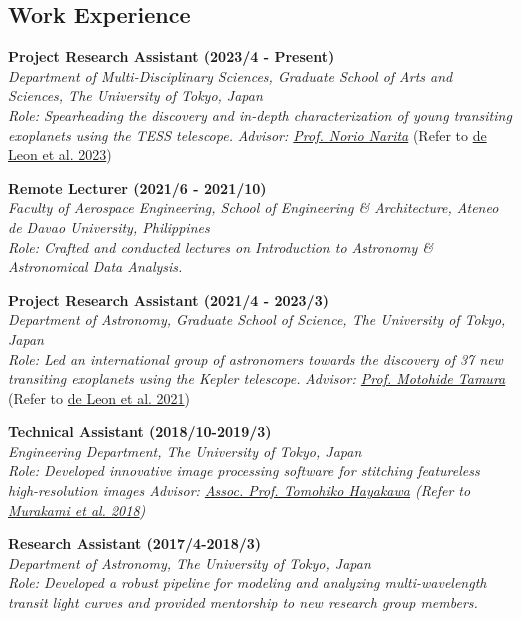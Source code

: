 \documentclass[11pt,letterpaper]{article}
\begin{document}
\subsection{Work Experience}
\begin{list}{}{\cvlist}
    \item
        \textbf{Project Research Assistant (2023/4 - Present)} \\
        \textit{Department of Multi-Disciplinary Sciences, Graduate School of Arts and Sciences, The University of Tokyo, Japan} \\
        \textit{Role: Spearheading the discovery and in-depth characterization of young transiting exoplanets using the TESS telescope.}
        \textit{Advisor: \href{\naritaurl}{Prof. Norio Narita}} (Refer to \href{\paperthree}{de Leon et al. 2023})\\

    \item
        \textbf{Remote Lecturer (2021/6 - 2021/10)} \\
        \textit{Faculty of Aerospace Engineering, School of Engineering \& Architecture, Ateneo de Davao University, Philippines} \\
        \textit{Role: Crafted and conducted lectures on Introduction to Astronomy \& Astronomical Data Analysis.}

    \item
        \textbf{Project Research Assistant (2021/4 - 2023/3)} \\
        \textit{Department of Astronomy, Graduate School of Science, The University of Tokyo, Japan} \\
        \textit{Role: Led an international group of astronomers towards the discovery of 37 new transiting exoplanets using the Kepler telescope.}
        \textit{Advisor: \href{tamuraurl}{Prof. Motohide Tamura}} (Refer to \href{\papertwo}{de Leon et al. 2021})\\
        
    \item 
        \textbf{Technical Assistant (2018/10-2019/3)}\\
        \textit{Engineering Department, The University of Tokyo, Japan}\\
        \textit{Role: Developed innovative image processing software for stitching featureless high-resolution images 
        \textit{Advisor: \href{hayakawaurl}{Assoc. Prof. Tomohiko Hayakawa}} (Refer to \href{\spieurl}{Murakami et al. 2018})}

    \item 
        \textbf{Research Assistant (2017/4-2018/3)}\\	
        \textit{Department of Astronomy, The University of Tokyo, Japan}\\
        \textit{Role: Developed a robust pipeline for modeling and analyzing multi-wavelength transit light curves and provided mentorship to new research group members.}


\end{list}
\end{document}
